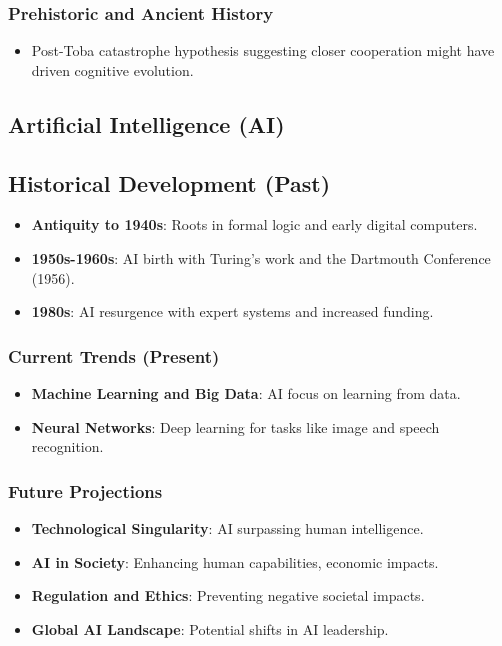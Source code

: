 \documentclass[12pt,titlepage]{book}
\begin{document}
\subsubsection{Prehistoric and Ancient History}
\begin{itemize}
    \item Post-Toba catastrophe hypothesis suggesting closer cooperation might have driven cognitive evolution.
\end{itemize}

\subsection{Artificial Intelligence (AI)}

\subsection{Historical Development (Past)}
\begin{itemize}
    \item \textbf{Antiquity to 1940s}: Roots in formal logic and early digital computers.
    \item \textbf{1950s-1960s}: AI birth with Turing's work and the Dartmouth Conference (1956).
    \item \textbf{1980s}: AI resurgence with expert systems and increased funding.
\end{itemize}

\subsubsection{Current Trends (Present)}
\begin{itemize}
    \item \textbf{Machine Learning and Big Data}: AI focus on learning from data.
    \item \textbf{Neural Networks}: Deep learning for tasks like image and speech recognition.
\end{itemize}

\subsubsection{Future Projections}
\begin{itemize}
    \item \textbf{Technological Singularity}: AI surpassing human intelligence.
    \item \textbf{AI in Society}: Enhancing human capabilities, economic impacts.
    \item \textbf{Regulation and Ethics}: Preventing negative societal impacts.
    \item \textbf{Global AI Landscape}: Potential shifts in AI leadership.
\end{itemize}
\end{document}
